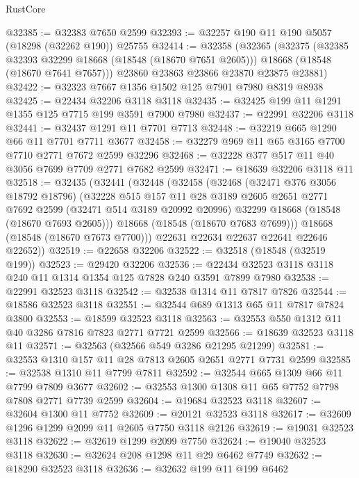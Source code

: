\begin{lexlean}{RustCore}
\begin{coremodule}
@32385 := @32383 @7650 @2599
@32393 := @32257 @190 @11 @190 @5057 (@18298 (@32262 @190)) @25755
@32414 := @32358
    (@32365
      (@32375
        (@32385 @32393 @32299 @18668 (@18548 (@18670 @7651 @2605)))
        @18668
        (@18548 (@18670 @7641 @7657)))
      @23860
      @23863
      @23866
      @23870
      @23875
      @23881)
@32422 := @32323 @7667 @1356 @1502 @125 @7901 @7980 @8319 @8938
@32425 := @22434 @32206 @3118 @3118
@32435 := @32425 @199 @11 @1291 @1355 @125 @7715 @199 @3591 @7900 @7980
@32437 := @22991 @32206 @3118
@32441 := @32437 @1291 @11 @7701 @7713
@32448 := @32219 @665 @1290 @66 @11 @7701 @7711 @3677
@32458 := @32279 @969 @11 @65 @3165 @7700 @7710 @2771 @7672 @2599 @32296
@32468 := @32228 @377 @517 @11 @40 @3056 @7699 @7709 @2771 @7682 @2599
@32471 := @18639 @32206 @3118 @11
@32518 := @32435
    (@32441
      (@32448
        (@32458
          (@32468
            (@32471 @376 @3056 @18792 @18796)
            (@32228
              @515
              @157
              @11
              @28
              @3189
              @2605
              @2651
              @2771
              @7692
              @2599
              (@32471 @514 @3189 @20992 @20996)
              @32299
              @18668
              (@18548 (@18670 @7693 @2605)))
            @18668
            (@18548 (@18670 @7683 @7699)))
          @18668
          (@18548 (@18670 @7673 @7700)))
        @22631
        @22634
        @22637
        @22641
        @22646
        @22652))
@32519 := @22658 @32206
@32522 := @32518 (@18548 (@32519 @199))
@32523 := @29420 @32206
@32536 := @22434 @32523 @3118 @3118 @240 @11 @1314 @1354 @125 @7828 @240 @3591 @7899 @7980
@32538 := @22991 @32523 @3118
@32542 := @32538 @1314 @11 @7817 @7826
@32544 := @18586 @32523 @3118
@32551 := @32544 @689 @1313 @65 @11 @7817 @7824 @3800
@32553 := @18599 @32523 @3118
@32563 := @32553 @550 @1312 @11 @40 @3286 @7816 @7823 @2771 @7721 @2599
@32566 := @18639 @32523 @3118 @11
@32571 := @32563 (@32566 @549 @3286 @21295 @21299)
@32581 := @32553 @1310 @157 @11 @28 @7813 @2605 @2651 @2771 @7731 @2599
@32585 := @32538 @1310 @11 @7799 @7811
@32592 := @32544 @665 @1309 @66 @11 @7799 @7809 @3677
@32602 := @32553 @1300 @1308 @11 @65 @7752 @7798 @7808 @2771 @7739 @2599
@32604 := @19684 @32523 @3118
@32607 := @32604 @1300 @11 @7752
@32609 := @20121 @32523 @3118
@32617 := @32609 @1296 @1299 @2099 @11 @2605 @7750 @3118 @2126
@32619 := @19031 @32523 @3118
@32622 := @32619 @1299 @2099 @7750
@32624 := @19040 @32523 @3118
@32630 := @32624 @208 @1298 @11 @29 @6462 @7749
@32632 := @18290 @32523 @3118
@32636 := @32632 @199 @11 @199 @6462

\end{coremodule}
\end{lexlean}
